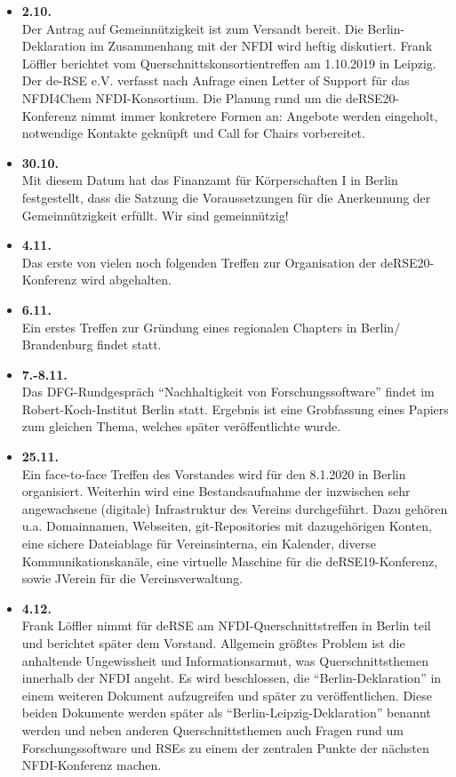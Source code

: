 \begin{itemize}
 \item \textbf{2.10.}\\
 Der Antrag auf Gemeinnützigkeit ist zum Versandt bereit. Die Berlin-Deklaration im Zusammenhang mit der NFDI wird heftig diskutiert. Frank Löffler berichtet vom Querschnittskonsortientreffen am 1.10.2019 in Leipzig. Der de-RSE e.V. verfasst nach Anfrage einen Letter of Support für das NFDI4Chem NFDI-Konsortium. Die Planung rund um die deRSE20-Konferenz nimmt immer konkretere Formen an: Angebote werden eingeholt, notwendige Kontakte geknüpft und Call for Chairs vorbereitet.

 \item \textbf{30.10.}\\
 Mit diesem Datum hat das Finanzamt für Körperschaften I in Berlin festgestellt, dass die Satzung die Voraussetzungen für die Anerkennung der Gemeinnützigkeit erfüllt. Wir sind gemeinnützig!

 \item \textbf{4.11.}\\
 Das erste von vielen noch folgenden Treffen zur Organisation der deRSE20-Konferenz wird abgehalten.

 \item \textbf{6.11.}\\
 Ein erstes Treffen zur Gründung eines regionalen Chapters in Berlin/ Brandenburg findet statt.

 \item \textbf{7.-8.11.}\\
 Das DFG-Rundgespräch "`Nachhaltigkeit von Forschungssoftware"' findet im Robert-Koch-Institut Berlin statt. Ergebnis ist eine Grobfassung eines Papiers zum gleichen Thema, welches später veröffentlichte wurde.

 \item \textbf{25.11.}\\
 Ein face-to-face Treffen des Vorstandes wird für den 8.1.2020 in Berlin organisiert. Weiterhin wird eine Bestandsaufnahme der inzwischen sehr angewachsene (digitale) Infrastruktur des Vereins durchgeführt. Dazu gehören u.a. Domainnamen, Webseiten, git-Repositories mit dazugehörigen Konten, eine sichere Dateiablage für Vereinsinterna, ein Kalender, diverse Kommunikationskanäle, eine virtuelle Maschine für die deRSE19-Konferenz, sowie JVerein für die Vereinsverwaltung.
\clearpage
 \item \textbf{4.12.}\\
 Frank Löffler nimmt für deRSE am NFDI-Querschnittstreffen in Berlin teil und berichtet später dem Vorstand. Allgemein größtes Problem ist die anhaltende Ungewissheit und Informationsarmut, was Querschnittsthemen innerhalb der NFDI angeht. Es wird beschlossen, die "`Berlin-Deklaration"' in einem weiteren Dokument aufzugreifen und später zu veröffentlichen. Diese beiden Dokumente werden später als "`Berlin-Leipzig-Deklaration"' benannt werden und neben anderen Querschnittsthemen auch Fragen rund um Forschungssoftware und RSEs zu einem der zentralen Punkte der nächsten NFDI-Konferenz machen.


\end{itemize}
